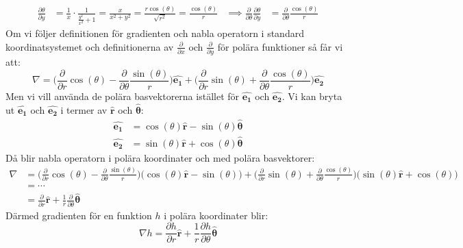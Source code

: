 \documentclass{report}
\begin{document}
{\begin{align*}
		\frac{\partial \theta}{\partial y} &= \frac{1}{x} \cdot \frac{1}{\frac{y^2}{x^2}+1} = \frac{x}{x^2+y^2} = \frac{r\cos(\theta)}{\sqrt{r^2}} = \frac{\cos(\theta)}{r} &\implies \frac{\partial }{\partial \theta} \frac{\partial \theta}{\partial y} &= \frac{\partial }{\partial \theta} \frac{\cos(\theta)}{r}
	\end{align*}
	Om vi följer definitionen för gradienten och nabla operatorn i standard koordinatsystemet och definitionerna av $\frac{\partial}{\partial x}$ och $\frac{\partial}{\partial y}$ för polära funktioner så får vi att:
	\begin{equation*}
		\nabla = \bigl(\frac{\partial }{\partial r}\cos(\theta)-\frac{\partial }{\partial \theta} \frac{\sin(\theta)}{r}\bigr)\boldsymbol{\hat{e_1}} + \bigl( \frac{\partial }{\partial r}\sin(\theta) + \frac{\partial }{\partial \theta} \frac{\cos(\theta)}{r} \bigr)\boldsymbol{\hat{e_2}}
	\end{equation*}
	Men vi vill använda de polära basvektorerna istället för $\boldsymbol{\hat{e_1}}$ och $\boldsymbol{\hat{e_2}}$. Vi kan bryta ut $\boldsymbol{\hat{e_1}}$ och $\boldsymbol{\hat{e_2}}$ i termer av $\boldsymbol{\hat{r}}$ och $\boldsymbol{\hat{\theta}}$:
	\begin{align*}
		\boldsymbol{\hat{e_1}} &= \cos(\theta)\boldsymbol{\hat{r}} - \sin(\theta)\boldsymbol{\hat{\theta}}\\
		\boldsymbol{\hat{e_2}} &= \sin(\theta)\boldsymbol{\hat{r}} + \cos(\theta)\boldsymbol{\hat{\theta}}
	\end{align*}
	Då blir nabla operatorn i polära koordinater och med polära basvektorer:
	\begin{align*}
	\nabla &= \bigl(\frac{\partial }{\partial r}\cos(\theta)-\frac{\partial }{\partial \theta} \frac{\sin(\theta)}{r}\bigr)\bigl(\cos(\theta)\boldsymbol{\hat{r}} - \sin(\theta)\bigr) + \bigl( \frac{\partial }{\partial r}\sin(\theta) + \frac{\partial }{\partial \theta} \frac{\cos(\theta)}{r} \bigr)\bigl(\sin(\theta)\boldsymbol{\hat{r}} + \cos(\theta)\bigr)\\
		&= \cdots\\
		&= \frac{\partial}{\partial r}\boldsymbol{\hat{r}} + \frac{1}{r}\frac{\partial}{\partial \theta}\boldsymbol{\hat{\theta}}
	\end{align*}
	Därmed gradienten för en funktion $h$ i polära koordinater blir:
	\begin{equation*}
		\nabla h = \frac{\partial h}{\partial r}\boldsymbol{\hat{r}} + \frac{1}{r}\frac{\partial h}{\partial \theta}\boldsymbol{\hat{\theta}}
	\end{equation*}
}
\end{document}
